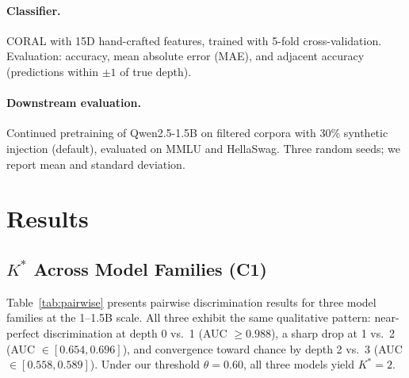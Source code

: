 \documentclass[11pt,a4paper]{article}
\begin{document}
\paragraph{Classifier.} CORAL with 15D hand-crafted features, trained with 5-fold cross-validation. Evaluation: accuracy, mean absolute error (MAE), and adjacent accuracy (predictions within $\pm 1$ of true depth).

\paragraph{Downstream evaluation.} Continued pretraining of Qwen2.5-1.5B on filtered corpora with 30\% synthetic injection (default), evaluated on MMLU and HellaSwag. Three random seeds; we report mean and standard deviation.

\section{Results}
\label{sec:results}

\subsection{$K^*$ Across Model Families (C1)}
\label{sec:kstar_results}

Table~\ref{tab:pairwise} presents pairwise discrimination results for three model families at the 1--1.5B scale. All three exhibit the same qualitative pattern: near-perfect discrimination at depth 0 vs.\ 1 (AUC $\geq 0.988$), a sharp drop at 1 vs.\ 2 (AUC $\in [0.654, 0.696]$), and convergence toward chance by depth 2 vs.\ 3 (AUC $\in [0.558, 0.589]$). Under our threshold $\theta{=}0.60$, all three models yield $K^*{=}2$.
\end{document}

